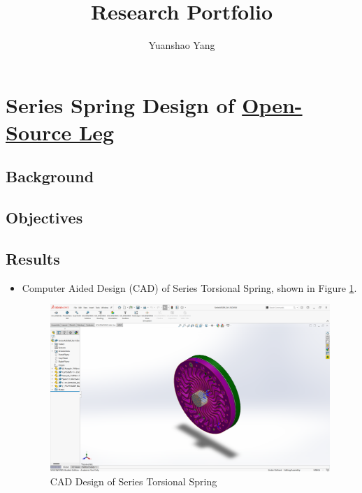 \documentclass[12pt]{article}
\title{Research Portfolio}
\author{Yuanshao Yang}
\begin{document}
\maketitle


\tableofcontents
\newpage

\section{Series Spring Design of \href{https://www.opensourceleg.org/}{Open-Source Leg}}

\subsection{Background}



\subsection{Objectives}



\subsection{Results}

\begin{itemize}
    \item {Computer Aided Design (CAD) of Series Torsional Spring, shown in Figure \ref*{Series Spring CAD}}. 
    
                
    \begin{figure}[H]

        \centering
        \includegraphics[width=1.0\textwidth]{portfolio/SeriesSpring_CAD.png}
        \caption{CAD Design of Series Torsional Spring}
        \label{Series Spring CAD}

    \end{figure}

        

\end{itemize}
\end{document}
